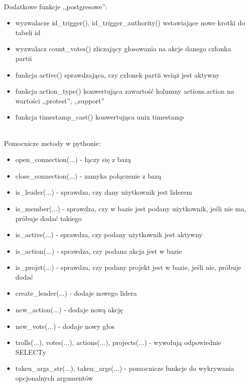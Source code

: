 \documentclass[12pt]{article}
\begin{document}
\\Dodatkowe funkcje ,,postgresowe'':
\begin{itemize}
\item wyzwalacze id\_trigger(), id\_trigger\_authority() wstawiające nowe krotki do tabeli id
\item wyzwalacz count\_votes() zliczający głosowania na akcje danego członka partii
\item funkcja active() sprawdzająca, czy członek partii wciąż jest aktywny
\item funkcja action\_type() konwertująca zawartość kolumny actions.action na wartości ,,protest'', ,,support''
\item funkcja timestamp\_cast() konwertująca unix timestamp 
\end{itemize}
\\Pomocnicze metody w pythonie:
\begin{itemize}
\item open\_connection(...) - łączy się z bazą
\item close\_connection(...) - zamyka połączenie z bazą
\item is\_leader(...) - sprawdza, czy dany użytkownik jest liderem
\item is\_member(...) - sprawdza, czy w bazie jest podany użytkownik, jeśli nie ma, próbuje dodać takiego
\item is\_active(...) - sprawdza, czy podany użytkownik jest aktywny
\item is\_action(...) - sprawdza, czy podana akcja jest w bazie
\item is\_projet(...) - sprawdza, czy podany projekt jest w bazie, jeśli nie, próbuje dodać
\item create\_leader(...) - dodaje nowego lidera
\item new\_action(...) - dodaje nową akcję
\item new\_vote(...) - dodaje nowy głos
\item trolls(...), votes(...), actions(...), projects(...) - wywołują odpowiednie SELECTy
\item taken\_args\_str(...), taken\_args(...) - pomocnicze funkcje do wykrywania opcjonalnych argumentów
\end{itemize}
\end{document}
